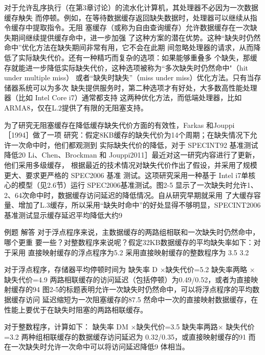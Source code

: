 对于允许乱序执行（在第3章讨论）的流水化计算机，其处理器不必因为一次数据缓存觖失
而停顿。例如，在等待数据缓存返回缺失数据时，处理器可以继续从指令缓存中提取指令。无阻
塞缓存（或称为自由查询缓存）允许数据缓存在一次缺失期间继续提供缓存命中，进一步加强
了这种方案的潜在优势。这种“缺失时仍然命中”优化方法在缺失期间非常有用，它不会在此期
间忽略处理器的请求，从而降低了实际缺失代价。还有一种精巧而复杂的选项：如果能够重叠多
个缺失，那缓存就能进一步降低实际缺失代价，这种选项被称为“多次缺失时仍然命中"（hit under
multiple miss） 或者“缺失时缺失”（miss under miss）优化方法。只有当存储器系统可以为多次
缺失提供服务时，第二种选项才有好处，大多数高性能处理器（比如 Intel Core i7）通常都支持
这两种优化方法，而低端处理器，比如 ARMA8，仅在L.2提供了有限的无阻塞支持。

为了研究无阻塞缓存在降低缓存缺失代价方面的有效性，Farkas 和Jouppi ［1994］做了一项
研究：假定8KB缓存的缺失代价为14个周期；在缺失情况下允许一次命中时，他们都观测到
实际缺失代价的降低，对于 SPECINT92 基准测试降低20%
Li、Chen、Brockman 和 Jouppi2011］最近对这一研究内容进行了更新，他们采用多级缓存，
根据最近的技术情况对缺失代价作出了假设，并采用了规模更大、要求更严格的 SPEC2006 基准
测试。这项研究采用一种基于 Intel i7单核心的模型（见2.6节）运行 SPEC2006基准测试。图2-5
显示了一次缺失时允许1、2、64次命中时，数据缓存访问延迟的降低情况。自从研究早期就采用
了大缓存容量、增加了L.3缓存，所以采用“缺失时命中”的好处显得不够明显，SPECINT2006
基准测试显示缓存延迟平均降低大约9%

例题
解答
对于浮点程序来说，主数据缓存的两路组相联和一次缺失时仍然命中，哪个更重
要一些？对整数程序来说呢？假定32KB数据缓存的平均缺失率如下：对于采用
直接映射缓存的浮点程序为5.2%
采用直接映射缓存的整数程序为 3.5%
3.2%

对于浮点程序，存储器平均停顿时间为
缺失率 D ×缺失代价=5.2%
缺失率两略 ×缺失代价=4.9%
两路相联缓存的访问延迟（包括停顿）为0.49/0.52，或者为直接映射缓存的94%
图2-5的标题表明允许一次缺失时仍然命中，可以将浮点程序的平均数据缓存访问
延迟缩短为一次阻塞缓存的87.5%
然命中一次的直接映射数据缓存，在性能上要优于在缺失时阻塞的两路相联缓存。

对于整数程序，计算如下：
缺失率 DM ×缺失代价=3.5%
缺失率两路× 缺失代价=3.2%
两种组相联缓存的数据缓存访问延迟为 0.32/0.35，或直接映射缓存的91%
而在一次缺失时允许一次命中可以将访问延迟降低9%
体相当。

